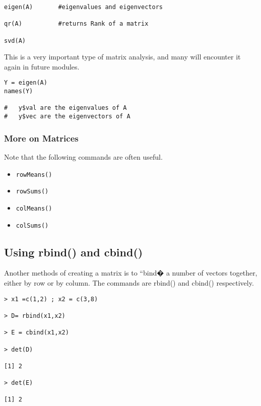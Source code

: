 \documentclass[a4paper,12pt]{article}
\begin{document}
\begin{verbatim}
eigen(A)       #eigenvalues and eigenvectors

qr(A)          #returns Rank of a matrix

svd(A)
\end{verbatim}
This is a very important type of matrix analysis, and many will encounter 
it again in future modules.


\begin{framed}
\begin{verbatim}
Y = eigen(A)
names(Y)

#   y$val are the eigenvalues of A
#   y$vec are the eigenvectors of A
\end{verbatim}
\end{framed}



\subsubsection{More on Matrices}

Note that the following commands are often useful.

\begin{itemize}
\item \texttt{rowMeans()}
\item \texttt{rowSums()}
\item \texttt{colMeans()}
\item \texttt{colSums()}
\end{itemize}


\subsection{Using rbind() and cbind()}
Another methods of creating a matrix is to ``bind� a number of vectors 
together, either by row or by column. 
The commands are rbind() and cbind() respectively.

\begin{framed}
\begin{verbatim}
> x1 =c(1,2) ; x2 = c(3,8)

> D= rbind(x1,x2)

> E = cbind(x1,x2)

> det(D)

[1] 2

> det(E)

[1] 2
\end{verbatim}
\end{framed}
\end{document}
